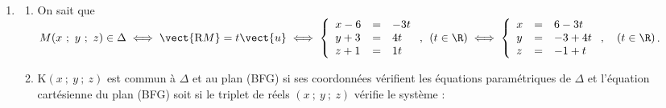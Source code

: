 \begin{enumerate}
Finalement $\cos \left(\vect{\text{IE}}~;~ \vect{\text{IF}}\right) = \dfrac{\dfrac{-5}{4}}{\dfrac{13}{4}} = - \dfrac{5}{13}$. La calculatrice donne $\left(\vect{\text{IE}}~;~ \vect{\text{IF}}\right) \approx 112,6\degres$.

$\bullet~~$ Avec le triangle (IEL) rectangle en L (L projeté orthogonal de I sur (EF) :

On a L$\left(\dfrac32~;~0~;~1\right)$, donc IL$^2 = 0 + 0 + 1^2 = 1$, d'où IL $= 1$ ;

On a vu que EI$ = \dfrac{\sqrt{13}}{2}$, d'où $\cos \left(\widehat{\text{EIL}} \right) = \dfrac{\text{IL}}{\text{IE}} = \dfrac{1}{\dfrac{\sqrt{13}}{2}} = \dfrac{2}{\sqrt{13}}$ : la calculatrice donne $\left(\widehat{\text{EIL}} \right) \approx 56,30\degres$ ; donc 
$\widehat{\text{EIF}} = 2\widehat{\text{EIL}}\approx 2 \times 56,30$, soit finalement $\widehat{\text{EIF}} \approx 112,6\degres$.
\item %


	\begin{enumerate}
		\item %
On sait que $M(x~;~y~;~z) \in \Delta \iff \vect{\text{R}M} = t \vect{u} \iff \left\{\begin{array}{l c l}
x - 6&=&- 3t\\
y + 3&=&4t\\
z + 1&=&1t
\end{array}\right.,\:\:  (t \in \R)\iff \left\{\begin{array}{l c l}
x &=&6 - 3t\\
y &=&- 3 + 4t\\
z &=&- 1 + t
\end{array}\right.,\quad  (t \in \R)$.
		\item %
		

K$(x~;~y~;~z)$ est commun à $\Delta$ et au plan (BFG) si ses coordonnées vérifient les équations paramétriques de $\Delta$ et l'équation cartésienne du plan (BFG) soit si le triplet de réels $(x~;~y~;~z)$ vérifie le système :


\end{enumerate}
\end{enumerate}

